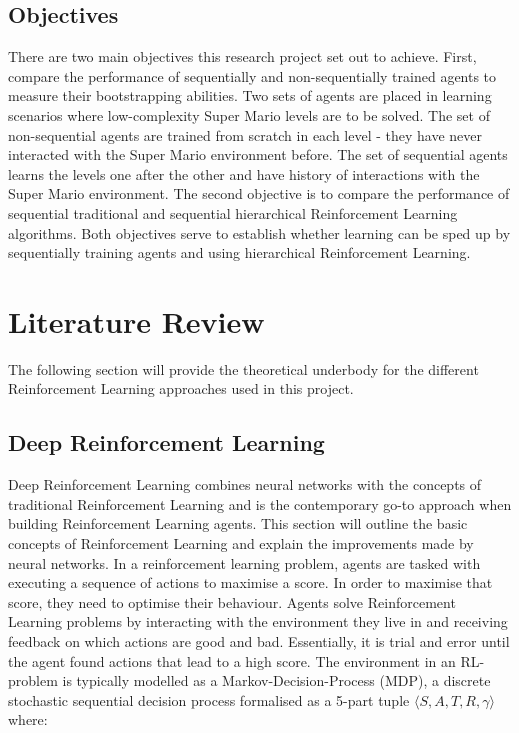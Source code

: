 \documentclass[notitlepage,a4paper,11pt]{article}
\begin{document}
\subsection{Objectives}
There are two main objectives this research project set out to achieve. First, compare the performance of sequentially and non-sequentially trained agents to measure their bootstrapping abilities. Two sets of agents are placed in learning scenarios where low-complexity Super Mario levels are to be solved. The set of non-sequential agents are trained from scratch in each level - they have never interacted with the Super Mario environment before. The set of sequential agents learns the levels one after the other and have history of interactions with the Super Mario environment. The second objective is to compare the performance of sequential traditional and sequential hierarchical Reinforcement Learning algorithms. Both objectives serve to establish whether learning can be sped up by sequentially training agents and using hierarchical Reinforcement Learning.

\section{Literature Review}
The following section will provide the theoretical underbody for the different Reinforcement Learning approaches used in this project. 


\subsection{Deep Reinforcement Learning}\label{deep_rl}
Deep Reinforcement Learning combines neural networks with the concepts of traditional Reinforcement Learning and is the contemporary go-to approach when building Reinforcement Learning agents. This section will outline the basic concepts of Reinforcement Learning and explain the improvements made by neural networks. In a reinforcement learning problem, agents are tasked with executing a sequence of actions to maximise a score. In order to maximise that score, they need to optimise their behaviour. Agents solve Reinforcement Learning problems by interacting with the environment they live in and receiving feedback on which actions are good and bad. Essentially, it is trial and error until the agent found actions that lead to a high score. The environment in an RL-problem is typically modelled as a Markov-Decision-Process (MDP), a discrete stochastic sequential decision process \cite{puterman2014markov} formalised as a 5-part tuple $\langle S, A, T, R, \gamma \rangle$ where:
\end{document}
